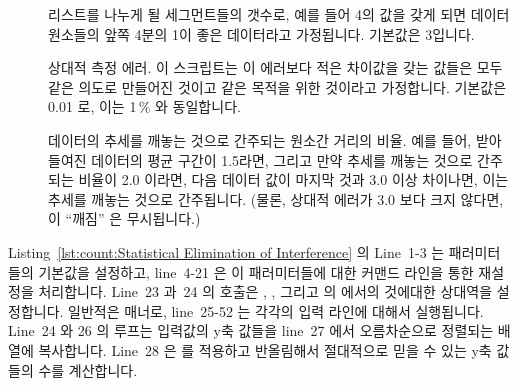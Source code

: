 \begin{description}
\item	[\nf{:}] 리스트를 나누게 될 세그먼트들의 갯수로, 예를
	들어 4의 값을 갖게 되면 데이터 원소들의 앞쪽 4분의 1이 좋은 데이터라고
	가정됩니다.
	기본값은 3입니다.
\item	[\nf{:}] 상대적 측정 에러.  이 스크립트는 이 에러보다
	적은 차이값을 갖는 값들은 모두 같은 의도로 만들어진 것이고 같은 목적을
	위한 것이라고 가정합니다.
	기본값은 0.01 로, 이는 1\,\% 와 동일합니다.
\item	[\nf{:}] 데이터의 추세를 깨놓는 것으로 간주되는
	원소간 거리의 비율.
	예를 들어, 받아들여진 데이터의 평균 구간이 1.5라면, 그리고 만약 추세를
	깨놓는 것으로 간주되는 비율이 2.0 이라면, 다음 데이터 값이 마지막 것과
	3.0 이상 차이나면, 이는 추세를 깨놓는 것으로 간주됩니다.
	(물론, 상대적 에러가 3.0 보다 크지 않다면, 이 ``깨짐'' 은 무시됩니다.)

\end{description}

Listing~\ref{lst:count:Statistical Elimination of Interference} 의 Line~1-3 는
패러미터들의 기본값을 설정하고, line~4-21 은 이 패러미터들에 대한 커맨드 라인을
통한 재설정을 처리합니다.
Line~23 과~24 의  호출은 , , 그리고
 의  에서의 것에대한 상대역을 설정합니다.
일반적은  매너로, line~25-52 는 각각의 입력 라인에 대해서 실행됩니다.
Line~24 와 26 의 루프는 입력값의 y축 값들을 line~27 에서 오름차순으로 정렬되는
 배열에 복사합니다.
Line~28 은  를 적용하고 반올림해서 절대적으로 믿을 수 있는  y축
값들의 수를 계산합니다.
\iffalse

